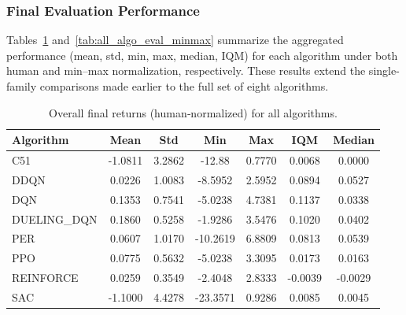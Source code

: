 \subsubsection{Final Evaluation Performance}

Tables~\ref{tab:all_algo_eval_human} and~\vref{tab:all_algo_eval_minmax} summarize the 
aggregated performance (mean, std, min, max, median, IQM) for each algorithm under both 
human and min--max normalization, respectively. These results extend 
the single-family comparisons made earlier to the full set of eight algorithms.

\begin{table} 
	\centering
	\caption{Overall final returns (human‐normalized) for all algorithms.}
	\label{tab:all_algo_eval_human}
	\begin{tabular}{lcccccc}
		\toprule
		\textbf{Algorithm} & \textbf{Mean} & \textbf{Std} & \textbf{Min} & \textbf{Max} & \textbf{IQM} & \textbf{Median} \\
		\midrule
		C51       & -1.0811 & 3.2862 & -12.88 & 0.7770 & 0.0068 & 0.0000 \\
		DDQN      & 0.0226  & 1.0083 & -8.5952 & 2.5952 & 0.0894 & 0.0527 \\
		DQN       & 0.1353  & 0.7541 & -5.0238 & 4.7381 & 0.1137 & 0.0338 \\
		DUELING\_DQN & 0.1860  & 0.5258 & -1.9286 & 3.5476 & 0.1020 & 0.0402 \\
		PER       & 0.0607  & 1.0170 & -10.2619 & 6.8809 & 0.0813 & 0.0539 \\
		PPO       & 0.0775  & 0.5632 & -5.0238 & 3.3095 & 0.0173 & 0.0163 \\
		REINFORCE & 0.0259  & 0.3549 & -2.4048 & 2.8333 & -0.0039 & -0.0029 \\
		SAC       & -1.1000 & 4.4278 & -23.3571 & 0.9286 & 0.0085 & 0.0045 \\
		\bottomrule
	\end{tabular}
\end{table}

